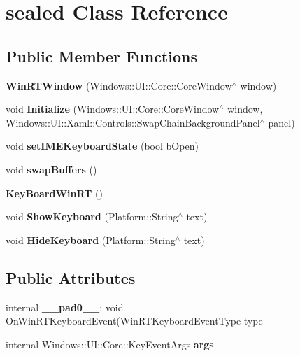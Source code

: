 \hypertarget{classsealed}{}\section{sealed Class Reference}
\label{classsealed}
\subsection*{Public Member Functions}
\begin{DoxyCompactItemize}
\item 
\mbox{\label{classsealed_aa3903ab207b468dcb3c3101aa70896cf}} 
{\bfseries Win\+R\+T\+Window} (Windows\+::\+U\+I\+::\+Core\+::\+Core\+Window$^\wedge$ window)
\item 
\mbox{\label{classsealed_a9984ac0b3abaeb6a46bdc49aabe47914}} 
void {\bfseries Initialize} (Windows\+::\+U\+I\+::\+Core\+::\+Core\+Window$^\wedge$ window, Windows\+::\+U\+I\+::\+Xaml\+::\+Controls\+::\+Swap\+Chain\+Background\+Panel$^\wedge$ panel)
\item 
\mbox{\label{classsealed_a06edbcea8ee55a4aff00d8a2bf85d307}} 
void {\bfseries set\+I\+M\+E\+Keyboard\+State} (bool b\+Open)
\item 
\mbox{\label{classsealed_a9d965051a4654e5a4daebb7041f0ec59}} 
void {\bfseries swap\+Buffers} ()
\item 
\mbox{\label{classsealed_a37486bf02409bd08b6fc400353cac2d2}} 
{\bfseries Key\+Board\+Win\+RT} ()
\item 
\mbox{\label{classsealed_ac67ef9e220b91f01efa2471276de6a28}} 
void {\bfseries Show\+Keyboard} (Platform\+::\+String$^\wedge$ text)
\item 
\mbox{\label{classsealed_af9e4492262787dc6e30b0b180d0b465a}} 
void {\bfseries Hide\+Keyboard} (Platform\+::\+String$^\wedge$ text)
\end{DoxyCompactItemize}
\subsection*{Public Attributes}
\begin{DoxyCompactItemize}
\item 
\mbox{\label{classsealed_a63e9e766e8c9cad965ae614108ab9bcb}} 
internal {\bfseries \+\_\+\+\_\+pad0\+\_\+\+\_\+}\+: void On\+Win\+R\+T\+Keyboard\+Event(Win\+R\+T\+Keyboard\+Event\+Type type
\item 
\mbox{\label{classsealed_a1f5e57057c6ca972b0c0a17a29ac68b1}} 
internal Windows\+::\+U\+I\+::\+Core\+::\+Key\+Event\+Args {\bfseries args}
\end{DoxyCompactItemize}


